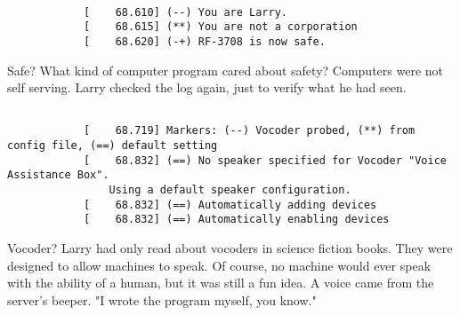 \documentclass{article}
\begin{document}
		\begin{lstlisting}
		
			[    68.610] (--) You are Larry.
			[    68.615] (**) You are not a corporation
			[    68.620] (-+) RF-3708 is now safe.
		\end{lstlisting}
		Safe? What kind of computer program cared about safety? Computers were not self serving. Larry checked the log again, just to verify what he had seen.
		\begin{lstlisting}
		
			[    68.719] Markers: (--) Vocoder probed, (**) from config file, (==) default setting
			[    68.832] (==) No speaker specified for Vocoder "Voice Assistance Box".
				Using a default speaker configuration.
			[    68.832] (==) Automatically adding devices
			[    68.832] (==) Automatically enabling devices
		\end{lstlisting}
		Vocoder? Larry had only read about vocoders in science fiction books. They were designed to allow machines to speak. Of course, no machine would ever speak with the ability of a human, but it was still a fun idea. A voice came from the server's beeper. "I wrote the program myself, you know."
\end{document}
